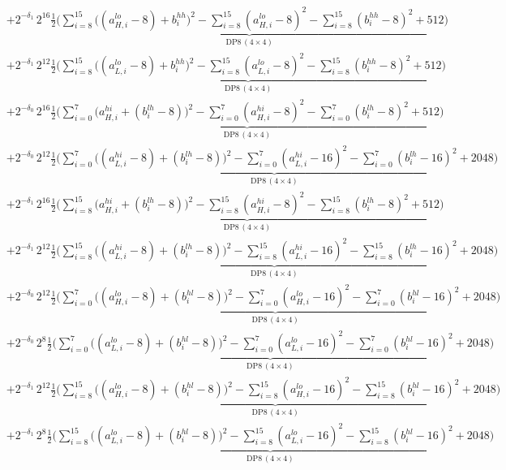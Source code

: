 \documentclass[fleqn]{article}
\newcommand{\DPop}[3]{\mathrm{DP#1}\,(#2\!\times\!#3)}
\begin{document}
{\begin{align*}
  & + 2^{-\delta_1}\,2^{16}\underbrace{\tfrac12\Big(\sum_{i=8}^{15}\big((a_{H,i}^{lo}{-}8){+}b_i^{hh}\big)^2 - \sum_{i=8}^{15}(a_{H,i}^{lo}{-}8)^2 - \sum_{i=8}^{15}(b_i^{hh}{-}8)^2 + 512\Big)}_{\DPop{8}{4}{4}} \\[0.25em]
  & + 2^{-\delta_1}\,2^{12}\underbrace{\tfrac12\Big(\sum_{i=8}^{15}\big((a_{L,i}^{lo}{-}8){+}b_i^{hh}\big)^2 - \sum_{i=8}^{15}(a_{L,i}^{lo}{-}8)^2 - \sum_{i=8}^{15}(b_i^{hh}{-}8)^2 + 512\Big)}_{\DPop{8}{4}{4}} \\[0.25em]
  & + 2^{-\delta_0}\,2^{16}\underbrace{\tfrac12\Big(\sum_{i=0}^{7}\big(a_{H,i}^{hi}{+}(b_i^{lh}{-}8)\big)^2 - \sum_{i=0}^{7}(a_{H,i}^{hi}{-}8)^2 - \sum_{i=0}^{7}(b_i^{lh}{-}8)^2 + 512\Big)}_{\DPop{8}{4}{4}} \\[0.25em]
  & + 2^{-\delta_0}\,2^{12}\underbrace{\tfrac12\Big(\sum_{i=0}^{7}\big((a_{L,i}^{hi}{-}8){+}(b_i^{lh}{-}8)\big)^2 - \sum_{i=0}^{7}(a_{L,i}^{hi}{-}16)^2 - \sum_{i=0}^{7}(b_i^{lh}{-}16)^2 + 2048\Big)}_{\DPop{8}{4}{4}} \\[0.25em]
  & + 2^{-\delta_1}\,2^{16}\underbrace{\tfrac12\Big(\sum_{i=8}^{15}\big(a_{H,i}^{hi}{+}(b_i^{lh}{-}8)\big)^2 - \sum_{i=8}^{15}(a_{H,i}^{hi}{-}8)^2 - \sum_{i=8}^{15}(b_i^{lh}{-}8)^2 + 512\Big)}_{\DPop{8}{4}{4}} \\[0.25em]
  & + 2^{-\delta_1}\,2^{12}\underbrace{\tfrac12\Big(\sum_{i=8}^{15}\big((a_{L,i}^{hi}{-}8){+}(b_i^{lh}{-}8)\big)^2 - \sum_{i=8}^{15}(a_{L,i}^{hi}{-}16)^2 - \sum_{i=8}^{15}(b_i^{lh}{-}16)^2 + 2048\Big)}_{\DPop{8}{4}{4}} \\[0.25em]
  & + 2^{-\delta_0}\,2^{12}\underbrace{\tfrac12\Big(\sum_{i=0}^{7}\big((a_{H,i}^{lo}{-}8){+}(b_i^{hl}{-}8)\big)^2 - \sum_{i=0}^{7}(a_{H,i}^{lo}{-}16)^2 - \sum_{i=0}^{7}(b_i^{hl}{-}16)^2 + 2048\Big)}_{\DPop{8}{4}{4}} \\[0.25em]
  & + 2^{-\delta_0}\,2^{8}\underbrace{\tfrac12\Big(\sum_{i=0}^{7}\big((a_{L,i}^{lo}{-}8){+}(b_i^{hl}{-}8)\big)^2 - \sum_{i=0}^{7}(a_{L,i}^{lo}{-}16)^2 - \sum_{i=0}^{7}(b_i^{hl}{-}16)^2 + 2048\Big)}_{\DPop{8}{4}{4}} \\[0.25em]
  & + 2^{-\delta_1}\,2^{12}\underbrace{\tfrac12\Big(\sum_{i=8}^{15}\big((a_{H,i}^{lo}{-}8){+}(b_i^{hl}{-}8)\big)^2 - \sum_{i=8}^{15}(a_{H,i}^{lo}{-}16)^2 - \sum_{i=8}^{15}(b_i^{hl}{-}16)^2 + 2048\Big)}_{\DPop{8}{4}{4}} \\[0.25em]
  & + 2^{-\delta_1}\,2^{8}\underbrace{\tfrac12\Big(\sum_{i=8}^{15}\big((a_{L,i}^{lo}{-}8){+}(b_i^{hl}{-}8)\big)^2 - \sum_{i=8}^{15}(a_{L,i}^{lo}{-}16)^2 - \sum_{i=8}^{15}(b_i^{hl}{-}16)^2 + 2048\Big)}_{\DPop{8}{4}{4}} \\[0.25em]

\end{align*}}
\end{document}
